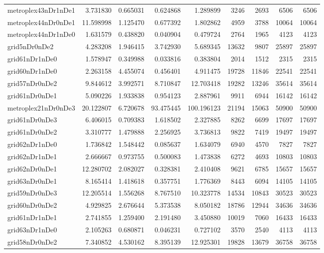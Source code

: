 \begin{longtable}{|l|r|r|r|r|r|r|r|r|}
metroplex43nDr1nDe1 & 3.731830 & 0.665031 & 0.624868 & 1.289899 & 3246 & 2693 & 6506 & 6506 \\
metroplex44nDr0nDe1 & 11.598998 & 1.125470 & 0.677392 & 1.802862 & 4959 & 3788 & 10064 & 10064 \\
metroplex44nDr1nDe0 & 1.631579 & 0.438820 & 0.040904 & 0.479724 & 2764 & 1965 & 4123 & 4123 \\
grid5nDr0nDe2 & 4.283208 & 1.946415 & 3.742930 & 5.689345 & 13632 & 9807 & 25897 & 25897 \\
grid61nDr1nDe0 & 1.578947 & 0.349988 & 0.033816 & 0.383804 & 2014 & 1512 & 2315 & 2315 \\
grid60nDr1nDe0 & 2.263158 & 4.455074 & 0.456401 & 4.911475 & 19728 & 11846 & 22541 & 22541 \\
grid57nDr0nDe2 & 9.844612 & 3.992571 & 8.710847 & 12.703418 & 19282 & 13246 & 35614 & 35614 \\
grid61nDr0nDe1 & 5.090226 & 1.933838 & 0.954123 & 2.887961 & 9911 & 6944 & 16142 & 16142 \\
metroplex21nDr0nDe3 & 20.122807 & 6.720678 & 93.475445 & 100.196123 & 21194 & 15063 & 50900 & 50900 \\
grid61nDr0nDe3 & 6.406015 & 0.709383 & 1.618502 & 2.327885 & 8262 & 6699 & 17697 & 17697 \\
grid61nDr0nDe2 & 3.310777 & 1.479888 & 2.256925 & 3.736813 & 9822 & 7419 & 19497 & 19497 \\
grid62nDr1nDe0 & 1.736842 & 1.548442 & 0.085637 & 1.634079 & 6940 & 4570 & 7827 & 7827 \\
grid62nDr1nDe1 & 2.666667 & 0.973755 & 0.500083 & 1.473838 & 6272 & 4693 & 10803 & 10803 \\
grid62nDr0nDe1 & 12.280702 & 2.082027 & 0.328381 & 2.410408 & 9621 & 6785 & 15657 & 15657 \\
grid63nDr0nDe1 & 8.165414 & 1.418618 & 0.357751 & 1.776369 & 8443 & 6094 & 14105 & 14105 \\
grid59nDr0nDe3 & 12.205514 & 1.556268 & 8.767510 & 10.323778 & 14534 & 10843 & 30523 & 30523 \\
grid60nDr0nDe2 & 4.929825 & 2.676644 & 5.373538 & 8.050182 & 18786 & 12944 & 34636 & 34636 \\
grid61nDr1nDe1 & 2.741855 & 1.259400 & 2.191480 & 3.450880 & 10019 & 7060 & 16433 & 16433 \\
grid63nDr1nDe0 & 2.105263 & 0.680871 & 0.046231 & 0.727102 & 3570 & 2540 & 4113 & 4113 \\
grid58nDr0nDe2 & 7.340852 & 4.530162 & 8.395139 & 12.925301 & 19828 & 13679 & 36758 & 36758 \\

\end{longtable}
